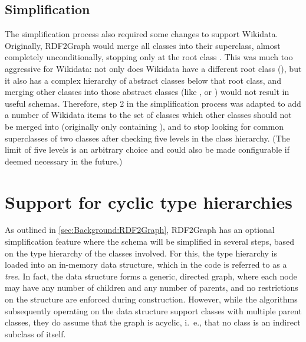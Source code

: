 \subsection{Simplification}
\label{subsec:RDF2Graph+Wikidata:Wikidata:simplification}

The simplification process also required some changes to support Wikidata.
Originally, RDF2Graph would merge all classes into their superclass,
almost completely unconditionally,
stopping only at the root class .
This was much too aggressive for Wikidata:
not only does Wikidata have a different root class (),
but it also has a complex hierarchy of abstract classes below that root class,
and merging other classes into those abstract classes
(like ,  or )
would not result in useful schemas.
Therefore, step 2 in the simplification process was adapted %
to add a number of Wikidata items to the set of classes which other classes should not be merged into
(originally only containing ),
and to stop looking for common superclasses of two classes after checking five levels in the class hierarchy.
(The limit of five levels is an arbitrary choice
and could also be made configurable if deemed necessary in the future.) %

\section{Support for cyclic type hierarchies}
\label{sec:RDF2Graph+Wikidata:cyclic-graphs}

As outlined in \cref{sec:Background:RDF2Graph}, %
RDF2Graph has an optional simplification feature
where the schema will be simplified in several steps,
based on the type hierarchy of the classes involved.
For this, the type hierarchy is loaded into an in-memory data structure,
which in the code is referred to as a \emph{tree}. %
In fact, the data structure forms a generic, directed graph,
where each node may have any number of children and any number of parents,
and no restrictions on the structure are enforced during construction.
However, while the algorithms subsequently operating on the data structure support classes with multiple parent classes,
they do assume that the graph is acyclic,
i.~e., that no class is an indirect subclass of itself.

